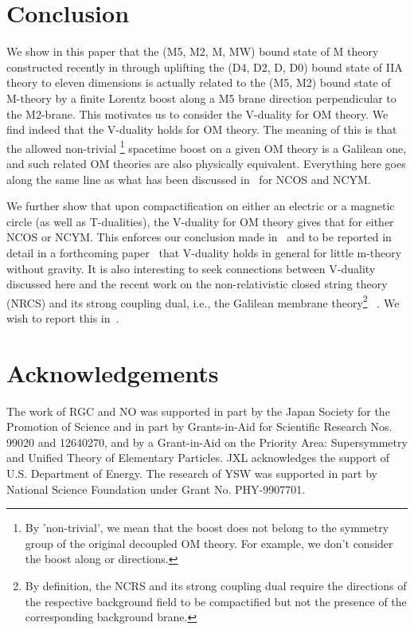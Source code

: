 \documentclass[a4paper,12pt]{article}
\providecommand{\sect}[1]{\setcounter{equation}{0}\section{#1}}
\begin{document}
\sect{Conclusion}

	We show in this paper that the (M5, M2, M\coordHE{}, MW) bound state of
M theory constructed recently in \cite{Berg3} through uplifting 
the (D4, D2, D\coordHE{}, D0) bound state of IIA theory to eleven dimensions
 is actually related
to the (M5, M2) bound state of M-theory by a finite Lorentz boost along a 
M5 brane direction perpendicular to the M2-brane. This motivates us to
consider the V-duality for OM theory. We find indeed that the V-duality 
holds for OM theory. The meaning of this is that the allowed 
non-trivial \footnote{By 'non-trivial', we mean that the boost does 
not belong to the symmetry group of the original decoupled OM
theory. For example, we don't consider the boost along \coordHE{} or \coordHE{} 
directions.} spacetime boost on a given OM theory is a Galilean one, 
and such related OM theories are also physically equivalent. 
Everything here goes along the same line as what has
been discussed in~\cite{CW,CLW} for NCOS and NCYM.

	We further show that upon compactification on either an electric
or a magnetic circle (as well as T-dualities), the V-duality for OM
theory gives that for either NCOS or NCYM. This enforces our conclusion
made in~\cite{CLW} and to be reported in detail in a forthcoming
paper~\cite{clwone} that V-duality holds in general for little m-theory
without gravity.  It is also interesting to seek connections between
V-duality discussed here and the recent work on the non-relativistic
closed string theory (NRCS) and its strong coupling dual, i.e., the Galilean
membrane theory\footnote{By definition, the NCRS and its strong coupling
dual require the directions of the
respective background field to be compactified but not the presence of 
the corresponding background brane.} ~\cite{gomo,dangktwo,dangkone}. We wish to
report this in~\cite{clwone}. 



 
\section*{Acknowledgements}
The work of RGC and NO was supported in part by the Japan Society for the
Promotion of Science and in part by Grants-in-Aid for Scientific Research
Nos. 99020 and 12640270, and by a Grant-in-Aid on the Priority Area:
Supersymmetry and Unified Theory of Elementary Particles. JXL acknowledges
the support of U.S. Department of Energy. The research of YSW was supported 
in part by National Science Foundation under Grant No. PHY-9907701.
\end{document}
